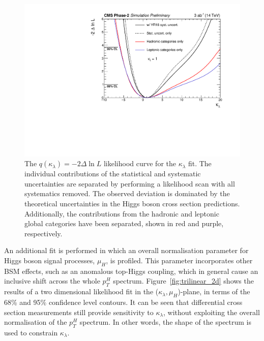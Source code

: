 \begin{figure}[htb!]
  \centering
  \includegraphics[width=.7\textwidth]{Figures/cms/trilinear/CMS-PAS-FTR-18-020_Figure_007.pdf}
  \caption[Likelihood curve for the $\kappa_\lambda$ fit]
  {
    The $q(\kappa_\lambda)=-2\Delta \ln L$ likelihood curve for the $\kappa_\lambda$ fit. The individual contributions of the statistical and systematic uncertainties are separated by performing a likelihood scan with all systematics removed. The observed deviation is dominated by the theoretical uncertainties in the Higgs boson cross section predictions. Additionally, the contributions from the hadronic and leptonic global categories have been separated, shown in red and purple, respectively.
  }
  \label{fig:trilinear_likelihood}
\end{figure}

An additional fit is performed in which an overall normalisation parameter for Higgs boson signal processes, $\mu_H$, is profiled. This parameter incorporates other BSM effects, such as an anomalous top-Higgs coupling, which in general cause an inclusive shift across the whole $p_T^H$ spectrum. Figure~\ref{fig:trilinear_2d} shows the results of a two dimensional likelihood fit in the ($\kappa_\lambda,\mu_H$)-plane, in terms of the 68\% and 95\% confidence level contours. It can be seen that differential cross section measurements still provide sensitivity to $\kappa_\lambda$, without exploiting the overall normalisation of the $p_T^H$ spectrum. In other words, the shape of the spectrum is used to constrain $\kappa_\lambda$.

